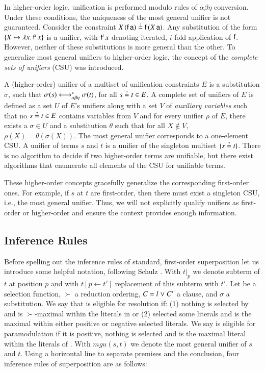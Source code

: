In higher-order logic, unification is performed modulo rules of
$\alpha\beta\eta$ conversion. Under these conditions, the uniqueness of the most
general unifier is not guaranteed. Consider the constraint $X \,
(\cst{f} \, \cst{a}) \unif \cst{f} \, (X \, \cst{a})$. Any substitution of the
form $\{ X \mapsto \lambda x.\> \mathsf{f}^i \, x \}$ is a unifier, with $\mathsf{f}^i \, x$
denoting iterated, $i$-fold application of $\mathsf{f}$. However, neither of these substitutions
is more general than the other. To generalize most general
unifiers to higher-order logic, the concept of the {\em complete sets of unifiers} (CSU) was
introduced.

A (higher-order) unifier of a multiset of unification constraints $E$ is
a substitution $\sigma$, such that $\sigma(s) \longleftrightarrow^*_{\alpha\beta\eta} \sigma(t)$, for all $s \unif t
\in E$. A complete set of unifiers of $E$ is defined as a
set $U$ of $E$'s unifiers along with a set $V$ of \emph{auxiliary variables}
such that no $s \unif t \in E$ contains variables from $V$ and for every unifier
$\rho$ of $E$, there exists a $\sigma \in U$ and a substitution $\theta$ such
that for all $X\not\in V,$ $\rho(X) = \theta(\sigma(X))$. The most general unifier
corresponds to a one-element CSU. A unifier of terms $s$ and $t$ is a unifier of
the singleton multiset $\{ s \unif t \}$. There is no algorithm to decide
if two higher-order terms are unifiable, but there exist algorithms
that enumerate all elements of the CSU for unifiable terms.

These higher-order concepts gracefully generalize the corresponding first-order
ones. For example, if $s$ at $t$ are first-order, then there must exist a singleton
CSU, i.e., the most general unifier. Thus, we will not explicitly qualify
unifiers as first-order or higher-order and ensure the context provides enough
information.

\subsection{Inference Rules}
\label{sec:pre:rules}
\newcommand{\mgu}{\ensuremath{\mathit{mgu}}}

Before spelling out the inference rules of standard, first-order superposition
let us introduce some helpful notation, following Schulz \cite{ss-02-brainiac}.
With $t|_p$ we denote subterm of $t$ at position $p$ and with $t[p \leftarrow
t']$ replacement of this subterm with $t'$. Let \selfun{} be a selection function,
$\succ$ a reduction ordering, $C = l \mathrel\lor C'$ a clause, and $\sigma$ a
substitution. We say that  is eligible for resolution if: (1) nothing
is selected by \selfun{} and  is $\succ$-maximal within the literals in
 or (2) \selfun{} selected some literals and  is the maximal
within either positive or negative selected literals. We say  is
eligible for paramodulation if it is positive, nothing is selected and
 is the maximal literal within the literals of . With
$\mgu(s,t)$ we denote the most general unifier of $s$ and $t$. Using a horizontal
line to separate premises and the conclusion, four inference rules of
superposition are as follows:

